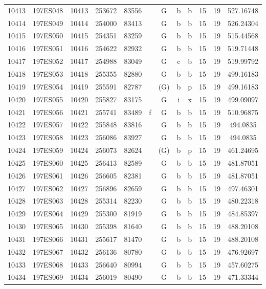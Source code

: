 \begin{tabular}{|*{12}{c|}}
10413 & 197ES048 & 10413 & 253672 & 83556 &  & G & b & b & 15 & 19 & 527.16748 \\ 
10414 & 197ES049 & 10414 & 254000 & 83413 &  & G & b & b & 15 & 19 & 526.24304 \\ 
10415 & 197ES050 & 10415 & 254351 & 83259 &  & G & b & b & 15 & 19 & 515.44568 \\ 
10416 & 197ES051 & 10416 & 254622 & 82932 &  & G & b & b & 15 & 19 & 519.71448 \\ 
10417 & 197ES052 & 10417 & 254988 & 83049 &  & G & c & b & 15 & 19 & 519.99792 \\ 
10418 & 197ES053 & 10418 & 255355 & 82880 &  & G & b & b & 15 & 19 & 499.16183 \\ 
10419 & 197ES054 & 10419 & 255591 & 82787 &  & (G) & b & p & 15 & 19 & 499.16183 \\ 
10420 & 197ES055 & 10420 & 255827 & 83175 &  & G & i & x & 15 & 19 & 499.09097 \\ 
10421 & 197ES056 & 10421 & 255741 & 83489 & f & G & b & b & 15 & 19 & 510.96875 \\ 
10422 & 197ES057 & 10422 & 255848 & 83816 &  & G & b & b & 15 & 19 & 494.0835 \\ 
10423 & 197ES058 & 10423 & 256086 & 83927 &  & G & b & b & 15 & 19 & 494.0835 \\ 
10424 & 197ES059 & 10424 & 256073 & 82624 &  & (G) & b & p & 15 & 19 & 461.24695 \\ 
10425 & 197ES060 & 10425 & 256413 & 82589 &  & G & b & b & 15 & 19 & 481.87051 \\ 
10426 & 197ES061 & 10426 & 256605 & 82381 &  & G & b & b & 15 & 19 & 481.87051 \\ 
10427 & 197ES062 & 10427 & 256896 & 82659 &  & G & b & b & 15 & 19 & 497.46301 \\ 
10428 & 197ES063 & 10428 & 255314 & 82230 &  & G & b & b & 15 & 19 & 480.22318 \\ 
10429 & 197ES064 & 10429 & 255300 & 81919 &  & G & b & b & 15 & 19 & 484.85397 \\ 
10430 & 197ES065 & 10430 & 255398 & 81640 &  & G & b & b & 15 & 19 & 488.20108 \\ 
10431 & 197ES066 & 10431 & 255617 & 81470 &  & G & b & b & 15 & 19 & 488.20108 \\ 
10432 & 197ES067 & 10432 & 256136 & 80780 &  & G & b & b & 15 & 19 & 476.92697 \\ 
10433 & 197ES068 & 10433 & 256640 & 80994 &  & G & b & b & 15 & 19 & 457.60275 \\ 
10434 & 197ES069 & 10434 & 256019 & 80490 &  & G & b & b & 15 & 19 & 471.33344 \\ 

\end{tabular}
